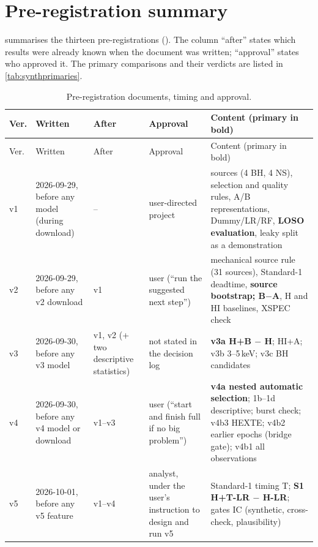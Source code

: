 \chapter{Pre-registration summary}\label{app:prereg}
 summarises the thirteen pre-registrations (). The column ``after'' states which
results were already known when the document was written; ``approval'' states who approved it. The primary comparisons and their
verdicts are listed in \cref{tab:synthprimaries}.

{\footnotesize\setlength{\tabcolsep}{3pt}
\begin{longtable}{@{}p{0.8cm}p{2.5cm}p{1.6cm}>{\raggedright\arraybackslash}p{3.0cm}>{\raggedright\arraybackslash}p{6.0cm}@{}}
\caption[Pre-registrations]{Pre-registration documents, timing and approval.}\label{tab:appprereg}\\
\toprule
Ver. & Written & After & Approval & Content (primary in bold) \\
\midrule\endfirsthead
\toprule Ver. & Written & After & Approval & Content (primary in bold) \\ \midrule\endhead
\bottomrule\endfoot
v1 & 2026-09-29, before any model (during download) & -- & user-directed project & sources (4 BH, 4 NS), selection and quality rules, A/B representations, Dummy/LR/RF, \textbf{LOSO evaluation}, leaky split as a demonstration \\
v2 & 2026-09-29, before any v2 download & v1 & user (``run the suggested next step'') & mechanical source rule (31 sources), Standard-1 deadtime, \textbf{source bootstrap; B$-$A}, H and HI baselines, XSPEC check \\
v3 & 2026-09-30, before any v3 model & v1, v2 (+ two descriptive statistics) & not stated in the decision log & \textbf{v3a H+B $-$ H}; HI+A; v3b 3--5\,keV; v3c BH candidates \\
v4 & 2026-09-30, before any v4 model or download & v1--v3 & user (``start and finish full if no big problem'') & \textbf{v4a nested automatic selection}; 1b--1d descriptive; burst check; v4b3 HEXTE; v4b2 earlier epochs (bridge gate); v4b1 all observations \\
v5 & 2026-10-01, before any v5 feature & v1--v4 & analyst, under the user's instruction to design and run v5 & Standard-1 timing T; \textbf{S1 H+T-LR $-$ H-LR}; gates IC (synthetic, cross-check, plausibility) \\

\end{longtable}}
